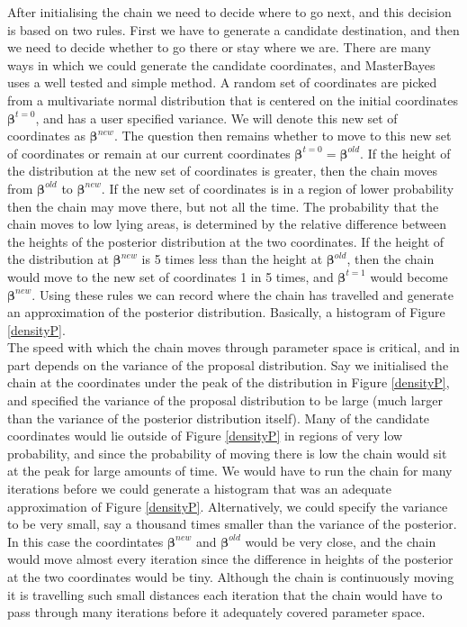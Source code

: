 \documentclass{article}
\begin{document}
After initialising the chain we need to decide where to go next, and this decision is based on two rules.  First we have to generate a candidate destination, and then we need to decide whether to go there or stay where we are.  There are many ways in which we could generate the candidate coordinates, and MasterBayes uses a well tested and simple method. A random set of coordinates are picked from a multivariate normal distribution that is centered on the initial coordinates  $\bm{\beta}^{t=0}$, and has a user specified variance.  We will denote this new set of coordinates as $\bm{\beta}^{new}$. The question then remains whether to move to this new set of coordinates or remain at our current coordinates $\bm{\beta}^{t=0} = \bm{\beta}^{old}$.  If the height of the distribution at the new set of coordinates is greater, then the chain moves from $\bm{\beta}^{old}$ to $\bm{\beta}^{new}$. If the new set of coordinates is in a region of lower probability then the chain may move there, but not all the time.  The probability that the chain moves to low lying areas, is determined by the relative difference between the heights of the posterior distribution at the two coordinates.  If the height of the distribution at $\bm{\beta}^{new}$ is 5 times less than the height at $\bm{\beta}^{old}$, then the chain would move to the new set of coordinates 1 in 5 times, and $\bm{\beta}^{t=1}$ would become $\bm{\beta}^{new}$.  Using these rules we can record where the chain has travelled and generate an approximation of the posterior distribution.  Basically, a histogram of Figure \ref{densityP}.\\

The speed with which the chain moves through parameter space is critical, and in part depends on the variance of the proposal distribution.  Say we initialised the chain at the coordinates under the peak of the distribution in Figure \ref{densityP}, and specified the variance of the proposal distribution to be large (much larger than the variance of the posterior distribution itself). Many of the candidate coordinates would lie outside of Figure \ref{densityP} in regions of very low probability, and since the probability of moving there is low the chain would sit at the peak for large amounts of time.  We would have to run the chain for many iterations before we could generate a histogram that was an adequate approximation of Figure \ref{densityP}.  Alternatively, we could specify the variance to be very small, say a thousand times smaller than the variance of the posterior.  In this case the coordintates $\bm{\beta}^{new}$ and $\bm{\beta}^{old}$ would be very close, and the chain would move almost every iteration since the difference in heights of the posterior at the two coordinates would be tiny.  Although the chain is continuously moving it is travelling such small distances each iteration that the chain would have to pass through many iterations before it adequately covered parameter space.\\  
\end{document}
